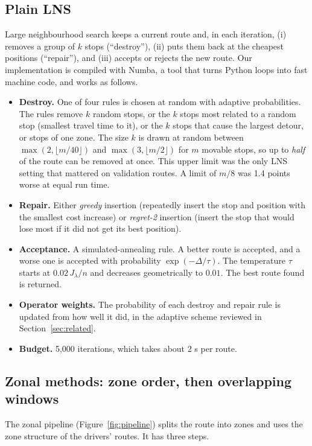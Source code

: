 \documentclass[11pt,a4paper]{article}
\newcommand{\Jl}{J_\lambda}
\begin{document}
\subsection{Plain LNS}\label{sec:lns}
Large neighbourhood search keeps a current route and, in each iteration, (i) removes a group of $k$ stops (``destroy''), (ii) puts them back at the cheapest positions (``repair''), and (iii) accepts or rejects the new route. Our implementation is compiled with Numba, a tool that turns Python loops into fast machine code, and works as follows.
\begin{itemize}
\item \textbf{Destroy.} One of four rules is chosen at random with adaptive probabilities. The rules remove $k$ random stops, or the $k$ stops most related to a random stop (smallest travel time to it), or the $k$ stops that cause the largest detour, or stops of one zone. The size $k$ is drawn at random between $\max(2,\lfloor m/40\rfloor)$ and $\max(3,\lfloor m/2\rfloor)$ for $m$ movable stops, so up to \emph{half} of the route can be removed at once. This upper limit was the only LNS setting that mattered on validation routes. A limit of $m/8$ was 1.4 points worse at equal run time.
\item \textbf{Repair.} Either \emph{greedy} insertion (repeatedly insert the stop and position with the smallest cost increase) or \emph{regret-2} insertion (insert the stop that would lose most if it did not get its best position).
\item \textbf{Acceptance.} A simulated-annealing rule. A better route is accepted, and a worse one is accepted with probability $\exp(-\Delta/\tau)$. The temperature $\tau$ starts at $0.02\,\Jl/n$ and decreases geometrically to $0.01$. The best route found is returned.
\item \textbf{Operator weights.} The probability of each destroy and repair rule is updated from how well it did, in the adaptive scheme reviewed in Section~\ref{sec:related}.
\item \textbf{Budget.} 5,000 iterations, which takes about 2 s per route.
\end{itemize}

\subsection{Zonal methods: zone order, then overlapping windows}\label{sec:zonal}
The zonal pipeline (Figure~\ref{fig:pipeline}) splits the route into zones and uses the zone structure of the drivers' routes. It has three steps.
\end{document}
